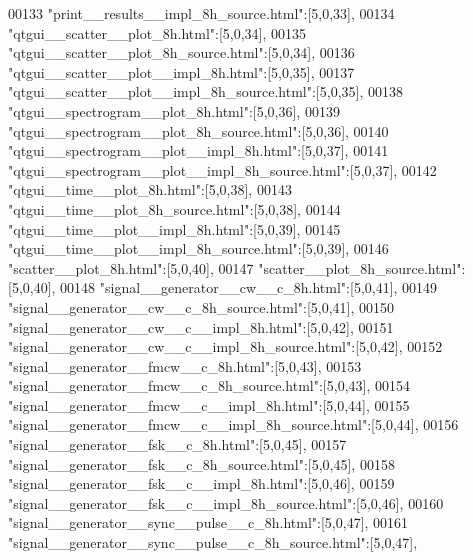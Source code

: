\begin{DoxyCode}
00133 \textcolor{stringliteral}{"print\_\_results\_\_impl\_8h\_source.html"}:[5,0,33],
00134 \textcolor{stringliteral}{"qtgui\_\_scatter\_\_plot\_8h.html"}:[5,0,34],
00135 \textcolor{stringliteral}{"qtgui\_\_scatter\_\_plot\_8h\_source.html"}:[5,0,34],
00136 \textcolor{stringliteral}{"qtgui\_\_scatter\_\_plot\_\_impl\_8h.html"}:[5,0,35],
00137 \textcolor{stringliteral}{"qtgui\_\_scatter\_\_plot\_\_impl\_8h\_source.html"}:[5,0,35],
00138 \textcolor{stringliteral}{"qtgui\_\_spectrogram\_\_plot\_8h.html"}:[5,0,36],
00139 \textcolor{stringliteral}{"qtgui\_\_spectrogram\_\_plot\_8h\_source.html"}:[5,0,36],
00140 \textcolor{stringliteral}{"qtgui\_\_spectrogram\_\_plot\_\_impl\_8h.html"}:[5,0,37],
00141 \textcolor{stringliteral}{"qtgui\_\_spectrogram\_\_plot\_\_impl\_8h\_source.html"}:[5,0,37],
00142 \textcolor{stringliteral}{"qtgui\_\_time\_\_plot\_8h.html"}:[5,0,38],
00143 \textcolor{stringliteral}{"qtgui\_\_time\_\_plot\_8h\_source.html"}:[5,0,38],
00144 \textcolor{stringliteral}{"qtgui\_\_time\_\_plot\_\_impl\_8h.html"}:[5,0,39],
00145 \textcolor{stringliteral}{"qtgui\_\_time\_\_plot\_\_impl\_8h\_source.html"}:[5,0,39],
00146 \textcolor{stringliteral}{"scatter\_\_plot\_8h.html"}:[5,0,40],
00147 \textcolor{stringliteral}{"scatter\_\_plot\_8h\_source.html"}:[5,0,40],
00148 \textcolor{stringliteral}{"signal\_\_generator\_\_cw\_\_c\_8h.html"}:[5,0,41],
00149 \textcolor{stringliteral}{"signal\_\_generator\_\_cw\_\_c\_8h\_source.html"}:[5,0,41],
00150 \textcolor{stringliteral}{"signal\_\_generator\_\_cw\_\_c\_\_impl\_8h.html"}:[5,0,42],
00151 \textcolor{stringliteral}{"signal\_\_generator\_\_cw\_\_c\_\_impl\_8h\_source.html"}:[5,0,42],
00152 \textcolor{stringliteral}{"signal\_\_generator\_\_fmcw\_\_c\_8h.html"}:[5,0,43],
00153 \textcolor{stringliteral}{"signal\_\_generator\_\_fmcw\_\_c\_8h\_source.html"}:[5,0,43],
00154 \textcolor{stringliteral}{"signal\_\_generator\_\_fmcw\_\_c\_\_impl\_8h.html"}:[5,0,44],
00155 \textcolor{stringliteral}{"signal\_\_generator\_\_fmcw\_\_c\_\_impl\_8h\_source.html"}:[5,0,44],
00156 \textcolor{stringliteral}{"signal\_\_generator\_\_fsk\_\_c\_8h.html"}:[5,0,45],
00157 \textcolor{stringliteral}{"signal\_\_generator\_\_fsk\_\_c\_8h\_source.html"}:[5,0,45],
00158 \textcolor{stringliteral}{"signal\_\_generator\_\_fsk\_\_c\_\_impl\_8h.html"}:[5,0,46],
00159 \textcolor{stringliteral}{"signal\_\_generator\_\_fsk\_\_c\_\_impl\_8h\_source.html"}:[5,0,46],
00160 \textcolor{stringliteral}{"signal\_\_generator\_\_sync\_\_pulse\_\_c\_8h.html"}:[5,0,47],
00161 \textcolor{stringliteral}{"signal\_\_generator\_\_sync\_\_pulse\_\_c\_8h\_source.html"}:[5,0,47],

\end{DoxyCode}

